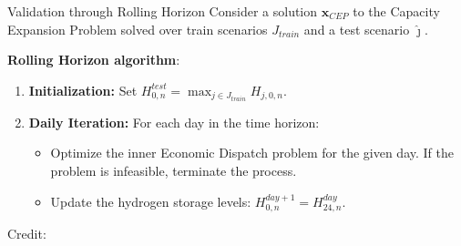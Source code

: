   \begin{frame}{Validation through Rolling Horizon}
    Consider a solution $\mathbf{x}_{CEP}$ to the Capacity Expansion Problem solved over train scenarios $J_{train}$ and a test scenario $\hat{\jmath}$.
    \vspace{1em}

    \textbf{Rolling Horizon algorithm}:
    \begin{enumerate}
      \item \textbf{Initialization:} Set \( H_{0,n}^{test} = \max_{j \in J_{train}} H_{j,0,n} \).
      
      \item \textbf{Daily Iteration:} For each day in the time horizon:
      \begin{itemize}
          \item Optimize the inner Economic Dispatch problem for the given day. If the problem is infeasible, terminate the process.
          \item Update the hydrogen storage levels: $H_{0,n}^{day+1} = H_{24,n}^{day}$.
      \end{itemize}
    \end{enumerate}
    \centering
      \hbox{\scriptsize Credit:}
  \end{frame}

